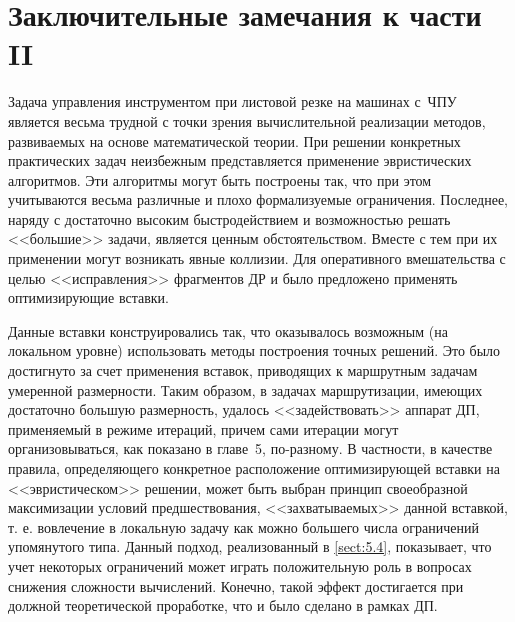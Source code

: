 
\clearpage
\section*{
  Заключительные замечания
  к части II
}

Задача управления инструментом при листовой резке на машинах с~ЧПУ
является весьма трудной с точки зрения вычислительной реализации методов,
развиваемых на основе математической теории.
При решении конкретных практических задач неизбежным
представляется применение эвристических алгоритмов.
Эти алгоритмы могут быть построены так,
что при этом учитываются весьма различные
и плохо формализуемые ограничения.
Последнее, наряду с достаточно высоким
быстродействием и возможностью решать <<большие>> задачи,
является ценным обстоятельством.
Вместе с тем при их применении могут возникать явные коллизии.
Для оперативного
вмешательства с целью <<исправления>> фрагментов ДР
и было предложено применять оптимизирующие вставки.

Данные вставки конструировались так,
что оказывалось возможным
(на локальном уровне)
использовать методы построения точных решений.
Это было достигнуто за счет применения вставок,
приводящих к маршрутным задачам умеренной размерности.
Таким образом, в задачах маршрутизации,
имеющих достаточно большую размерность,
удалось <<задействовать>> аппарат ДП, применяемый в режиме итераций,
причем сами итерации могут организовываться,
как показано в главе~5, по-разному.
В частности, в качестве правила,
определяющего конкретное расположение оптимизирующей вставки на
<<эвристическом>> решении,
может быть выбран принцип своеобразной максимизации условий предшествования,
<<захватываемых>> данной вставкой,
т. е. вовлечение в локальную задачу
как можно большего числа ограничений упомянутого типа.
Данный подход, реализованный
в \ref{sect:5.4},
показывает,
что учет некоторых ограничений может играть положительную роль
в вопросах снижения сложности вычислений.
Конечно, такой эффект достигается при должной
теоретической проработке,
что и было сделано в рамках ДП.
